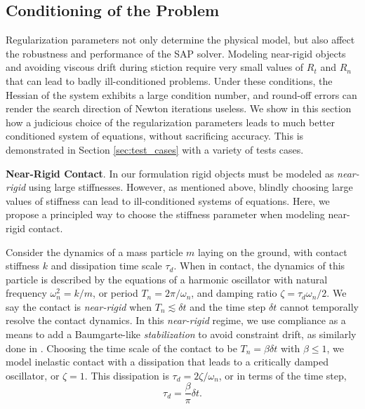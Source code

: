 
\subsection{Conditioning of the Problem}
\label{sec:conditioning}

Regularization parameters not only determine the physical model, but also affect
the robustness and performance of the SAP solver. Modeling near-rigid objects
and avoiding viscous drift during stiction require very small values of $R_t$
and $R_n$ that can lead to badly ill-conditioned problems. Under these
conditions, the Hessian of the system exhibits a large condition number, and
round-off errors can render the search direction of Newton iterations useless.
We show in this section how a judicious choice of the regularization parameters
leads to much better conditioned system of equations, without sacrificing
accuracy. This is demonstrated in Section \ref{sec:test_cases} with a variety of
tests cases.

\textbf{Near-Rigid Contact}. In our formulation rigid objects must be modeled as
\emph{near-rigid} using large stiffnesses. However, as mentioned above,
blindly choosing large values of stiffness can lead to ill-conditioned systems
of equations. Here, we propose a principled way to choose the stiffness
parameter when modeling near-rigid contact.

Consider the dynamics of a mass particle $m$ laying on the ground, with contact
stiffness $k$ and dissipation time scale $\tau_d$. When in contact, the dynamics
of this particle is described by the equations of a harmonic oscillator with
natural frequency $\omega_n^2 = k/m$, or period $T_n = 2\pi/\omega_n$, and
damping ratio $\zeta=\tau_d\omega_n/2$. We say the contact is \emph{near-rigid}
when $T_n \lesssim \delta t$ and the time step $\delta t$ cannot temporally
resolve the contact dynamics. In this \emph{near-rigid} regime, we use
compliance as a means to add a Baumgarte-like \emph{stabilization} to avoid
constraint drift, as similarly done in \cite{bib:todorov2011}. Choosing the time
scale of the contact to be $T_n = \beta \delta t$ with $\beta \le 1$, we model
inelastic contact with a dissipation that leads to a critically damped
oscillator, or $\zeta=1$. This dissipation is $\tau_d=2\zeta/\omega_n$, or in
terms of the time step,
\begin{equation*}
    \tau_d=\frac{\beta}{\pi}\delta t.
\end{equation*}


